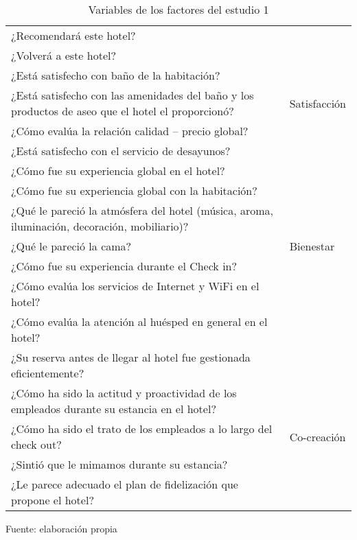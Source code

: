 \begin{table}[h]
    \caption {Variables de los factores del estudio 1}
	\label{tab:variablesFactores1}
	\setlength\extrarowheight{5pt}
	
	\begin{tabular}{p{11.8cm} p{2.9cm}}
	\toprule
	¿Recomendará este hotel? & \\
	¿Volverá a este hotel? & \\
	¿Está satisfecho con baño de la habitación? &  \\
	¿Está satisfecho con las amenidades del baño y los productos de aseo que el hotel el proporcionó? & Satisfacción \\
	¿Cómo evalúa la relación calidad – precio global? & \\
	¿Está satisfecho con el servicio de desayunos? & \\
	\midrule
	¿Cómo fue su experiencia global en el hotel? & \\
	¿Cómo fue su experiencia global con la habitación? & \\
	¿Qué le pareció la atmósfera del hotel (música, aroma, iluminación, decoración, mobiliario)? & \\
	¿Qué le pareció la cama? & Bienestar \\
	¿Cómo fue su experiencia durante el Check in? & \\
	¿Cómo evalúa los servicios de Internet y WiFi en el hotel? & \\
	¿Cómo evalúa la atención al huésped en general en el hotel? & \\
	¿Su reserva antes de llegar al hotel fue gestionada eficientemente? & \\
	\midrule
	¿Cómo ha sido la actitud y proactividad de los empleados durante su estancia en el hotel? & \\
	¿Cómo ha sido el trato de los empleados a lo largo del check out? & Co-creación \\
	¿Sintió que le mimamos durante su estancia? & \\
	¿Le parece adecuado el plan de fidelización que propone el hotel? & \\

	\bottomrule
	\end{tabular}
	
	\center
	\footnotesize
	Fuente: elaboración propia
\end{table}
